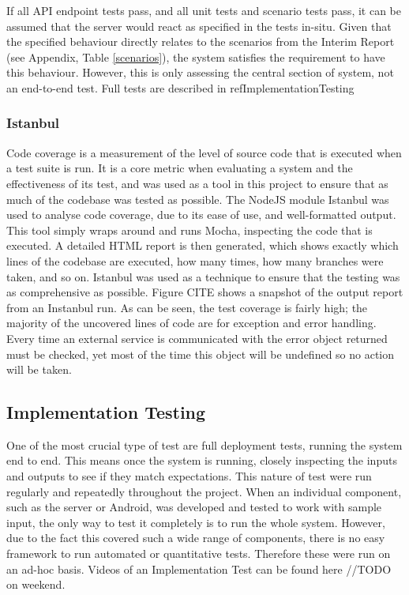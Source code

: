 \documentclass{article}
\begin{document}
If all API endpoint tests pass, and all unit tests and scenario tests pass, it can be assumed that the server would react as specified in the tests in-situ. Given that the specified behaviour directly relates to the scenarios from the Interim Report (see Appendix, Table \ref{scenarios}), the system satisfies the requirement to have this behaviour. However, this is only assessing the central section of system, not an end-to-end test. Full tests are described in ref{ImplementationTesting}

\subsubsection{Istanbul}
Code coverage is a measurement of the level of source code that is executed when a test suite is run. It is a core metric when evaluating a system and the effectiveness of its test, and was used as a tool in this project to ensure that as much of the codebase was tested as possible. The NodeJS module Istanbul was used to analyse code coverage, due to its ease of use, and well-formatted output\cite{istanbul}. This tool simply wraps around and runs Mocha, inspecting the code that is executed. A detailed HTML report is then generated, which shows exactly which lines of the codebase are executed, how many times, how many branches were taken, and so on. Istanbul was used as a technique to ensure that the testing was as comprehensive as possible. Figure CITE shows a snapshot of the output report from an Instanbul run. As can be seen, the test coverage is fairly high; the majority of the uncovered lines of code are for exception and error handling. Every time an external service is communicated with the error object returned must be checked, yet most of the time this object will be undefined so no action will be taken.

\subsection{Implementation Testing}\label{ImplementationTesting}
One of the most crucial type of test are full deployment tests, running the system end to end. This means once the system is running, closely inspecting the inputs and outputs to see if they match expectations. This nature of test were run regularly and repeatedly throughout the project. When an individual component, such as the server or Android, was developed and tested to work with sample input, the only way to test it completely is to run the whole system. However, due to the fact this covered such a wide range of components, there is no easy framework to run automated or quantitative tests. Therefore these were run on an ad-hoc basis. Videos of an Implementation Test can be found here //TODO on weekend. 
\end{document}
